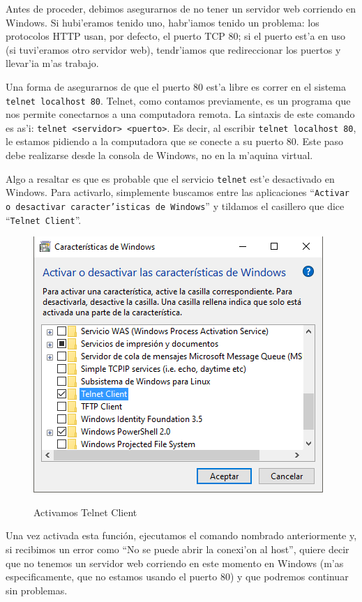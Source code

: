 \documentclass[11pt]{article}
\begin{document}
		Antes de proceder, debimos asegurarnos de no tener un servidor web corriendo en Windows. Si hubi'eramos tenido uno, habr'iamos tenido un problema: los protocolos HTTP usan, por defecto, el puerto TCP 80; si el puerto est'a en uso (si tuvi'eramos otro servidor web), tendr'iamos que redireccionar los puertos y llevar'ia m'as trabajo.

		Una forma de asegurarnos de que el puerto 80 est'a libre es correr en el sistema \texttt{telnet localhost 80}. Telnet, como contamos previamente, es un programa que nos permite conectarnos a una computadora remota. La sintaxis de este comando es as'i: \texttt{telnet <servidor>{} <puerto>}. Es decir, al escribir \texttt{telnet localhost 80}, le estamos pidiendo a la computadora que se conecte a su puerto 80. Este paso debe realizarse desde la consola de Windows, no en la m'aquina virtual.

		Algo a resaltar es que es probable que el servicio \texttt{telnet} est'e desactivado en Windows. Para activarlo, simplemente buscamos entre las aplicaciones ``\texttt{Activar o desactivar caracter'isticas de Windows}'' y tildamos el casillero que dice ``\texttt{Telnet Client}''. 

		\begin{figure}[H]
  			\centering \captionsetup{justification=centering}
    			\includegraphics[scale=0.65]{Images/Apache/fig3.png}
    			\label{fig:3}
    			\caption{Activamos Telnet Client}
		\end{figure}

		Una vez activada esta función, ejecutamos el comando nombrado anteriormente y, si recibimos un error como ``No se puede abrir la conexi'on al host'', quiere decir que no tenemos un servidor web corriendo en este momento en Windows (m'as especificamente, que no estamos usando el puerto 80) y que podremos continuar sin problemas.
\end{document}
